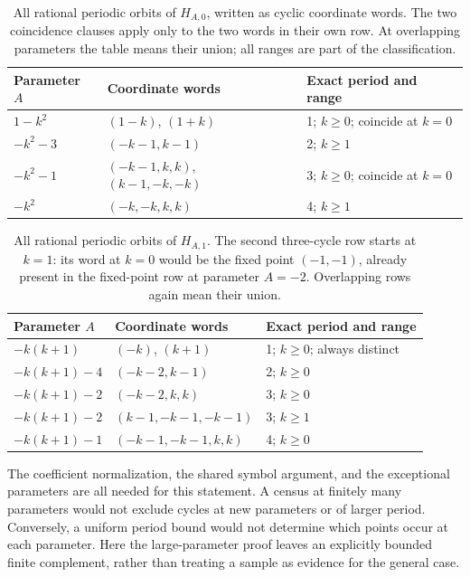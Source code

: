 \begin{table}[htbp]
\centering
\small
\begin{tabular}{@{}L{0.22\textwidth}L{0.39\textwidth}L{0.31\textwidth}@{}}
\toprule
Parameter \(A\) & Coordinate words & Exact period and range \\
\midrule
\(1-k^2\) & \((1-k)\), \((1+k)\) & 1; \(k\ge0\); coincide at \(k=0\) \\
\(-k^2-3\) & \((-k-1,k-1)\) & 2; \(k\ge1\) \\
\(-k^2-1\) & \((-k-1,k,k)\), \((k-1,-k,-k)\) & 3; \(k\ge0\); coincide at \(k=0\) \\
\(-k^2\) & \((-k,-k,k,k)\) & 4; \(k\ge1\) \\
\bottomrule
\end{tabular}
\caption{All rational periodic orbits of \(H_{A,0}\), written as cyclic
coordinate words. The two coincidence clauses apply only to the two
words in their own row. At overlapping parameters the table means their
union; all ranges are part of the classification.}
\label{tab:even}
\end{table}

\begin{table}[htbp]
\centering
\small
\begin{tabular}{@{}L{0.25\textwidth}L{0.38\textwidth}L{0.29\textwidth}@{}}
\toprule
Parameter \(A\) & Coordinate words & Exact period and range \\
\midrule
\(-k(k+1)\) & \((-k)\), \((k+1)\) & 1; \(k\ge0\); always distinct \\
\(-k(k+1)-4\) & \((-k-2,k-1)\) & 2; \(k\ge0\) \\
\(-k(k+1)-2\) & \((-k-2,k,k)\) & 3; \(k\ge0\) \\
\(-k(k+1)-2\) & \((k-1,-k-1,-k-1)\) & 3; \(k\ge1\) \\
\(-k(k+1)-1\) & \((-k-1,-k-1,k,k)\) & 4; \(k\ge0\) \\
\bottomrule
\end{tabular}
\caption{All rational periodic orbits of \(H_{A,1}\). The second
three-cycle row starts at \(k=1\): its word at \(k=0\) would be the
fixed point \((-1,-1)\), already present in the fixed-point row at
parameter \(A=-2\). Overlapping rows again mean their union.}
\label{tab:odd}
\end{table}

The coefficient normalization, the shared symbol argument, and the
exceptional parameters are all needed for this statement. A census at
finitely many parameters would not exclude cycles at new parameters or
of larger period. Conversely, a uniform period bound would not determine
which points occur at each parameter. Here the large-parameter proof
leaves an explicitly bounded finite complement, rather than treating a
sample as evidence for the general case.


